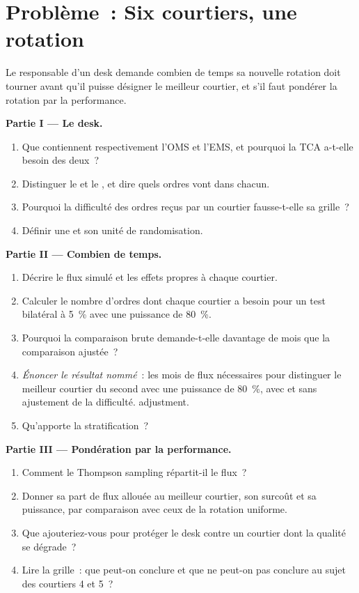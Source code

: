 \section{Problème~: Six courtiers, une rotation}

\begin{problem}\label{pb:mx:the-buy-side-trading-desk-and-its-brokers:1}
Le responsable d'un desk demande combien de temps sa nouvelle rotation doit tourner avant qu'il puisse désigner le meilleur courtier, et s'il faut pondérer la rotation par la performance.

\medskip\noindent\textbf{Partie I --- Le desk.}
\begin{enumerate}
\item Que contiennent respectivement l'OMS et l'EMS, et pourquoi la TCA a-t-elle besoin des deux~?
\item Distinguer le  et le , et dire quels ordres vont dans chacun.
\item Pourquoi la difficulté des ordres reçus par un courtier fausse-t-elle sa grille~?
\item Définir une  et son unité de randomisation.
\end{enumerate}

\medskip\noindent\textbf{Partie II --- Combien de temps.}
\begin{enumerate}[resume]
\item Décrire le flux simulé et les effets propres à chaque courtier.
\item Calculer le nombre d'ordres dont chaque courtier a besoin pour un test bilatéral à 5~\% avec une puissance de 80~\%.
\item Pourquoi la comparaison brute demande-t-elle davantage de mois que la comparaison ajustée~?
\item \emph{Énoncer le résultat nommé}~: les mois de flux nécessaires pour distinguer le meilleur courtier du second avec une puissance de 80~\%, avec et sans ajustement de la difficulté.
adjustment.
\item Qu'apporte la stratification~?
\end{enumerate}

\medskip\noindent\textbf{Partie III --- Pondération par la performance.}
\begin{enumerate}[resume]
\item Comment le Thompson sampling répartit-il le flux~?
\item Donner sa part de flux allouée au meilleur courtier, son surcoût et sa puissance, par comparaison avec ceux de la rotation uniforme.
\item Que ajouteriez-vous pour protéger le desk contre un courtier dont la qualité se dégrade~?
\item Lire la grille~: que peut-on conclure et que ne peut-on pas conclure au sujet des courtiers 4 et 5~?
\end{enumerate}


\end{problem}
